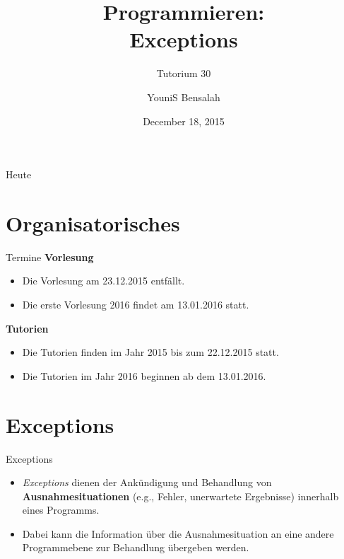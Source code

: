 \documentclass[18pt]{beamer}
\title[Exceptions]{Programmieren:\\ Exceptions}
\subtitle{Tutorium 30}
\author{YouniS Bensalah}
\date{December 18, 2015}
\institute{Chair for Software Design and Quality}
\begin{document}

\begin{frame}
\titlepage
\end{frame}

\begin{frame}{Heute}
\tableofcontents
\end{frame}

\section{Organisatorisches}

\begin{frame}{Termine}
    \textbf{Vorlesung}
    \begin{itemize}
        \item Die Vorlesung am 23.12.2015 entfällt.
        \item Die erste Vorlesung 2016 findet am 13.01.2016 statt.
    \end{itemize}

    \textbf{Tutorien}
    \begin{itemize}
        \item Die Tutorien finden im Jahr 2015 bis zum 22.12.2015 statt.
        \item Die Tutorien im Jahr 2016 beginnen ab dem 13.01.2016.
    \end{itemize}
\end{frame}

\section{Exceptions}



\begin{frame}{Exceptions}
    \begin{block}{}
        \begin{itemize}
            \item \textit{Exceptions} dienen der Ankündigung und Behandlung von \textbf{Ausnahmesituationen} (e.g., Fehler, unerwartete Ergebnisse) innerhalb eines Programms.
            \item Dabei kann die Information über die Ausnahmesituation an eine andere Programmebene zur Behandlung übergeben werden.
        \end{itemize}
    \end{block}

\end{frame}
\end{document}
